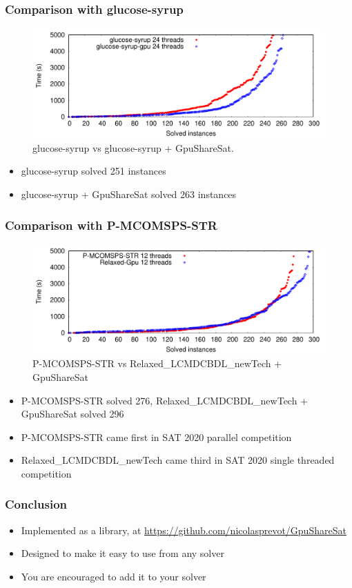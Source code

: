 \documentclass{beamer}
\begin{document}
\begin{frame}
\frametitle{Comparison with glucose-syrup}
\begin{figure}[h]
	\includegraphics[width=\textwidth]{cactusplot_syrup_vs_syrup_gpu}
	\caption{glucose-syrup vs glucose-syrup + GpuShareSat.}
	\label{cactus:syrup}
\end{figure}
\begin{itemize}
\item glucose-syrup solved 251 instances
\item glucose-syrup + GpuShareSat solved 263 instances
\end{itemize}
\end{frame}

\begin{frame}
\frametitle{Comparison with P-MCOMSPS-STR}
\begin{figure}[htb]
	\centering
	\includegraphics[width=\textwidth]{cactusplot_painless_vs_relaxed_gpu}
	\caption{P-MCOMSPS-STR vs Relaxed\_LCMDCBDL\_newTech + GpuShareSat}
	\label{cactus:relaxed}
\end{figure}
\begin{itemize}
\item P-MCOMSPS-STR solved 276, Relaxed\_LCMDCBDL\_newTech + GpuShareSat solved 296
\item P-MCOMSPS-STR came first in SAT 2020 parallel competition
\item Relaxed\_LCMDCBDL\_newTech came third in SAT 2020 single threaded competition
\end{itemize}
\end{frame}

\begin{frame}
\frametitle{Conclusion}
\begin{itemize}
\item Implemented as a library, at \url{https://github.com/nicolasprevot/GpuShareSat}
\item Designed to make it easy to use from any solver
\item You are encouraged to add it to your solver
\end{itemize}
\end{frame}
\end{document}

